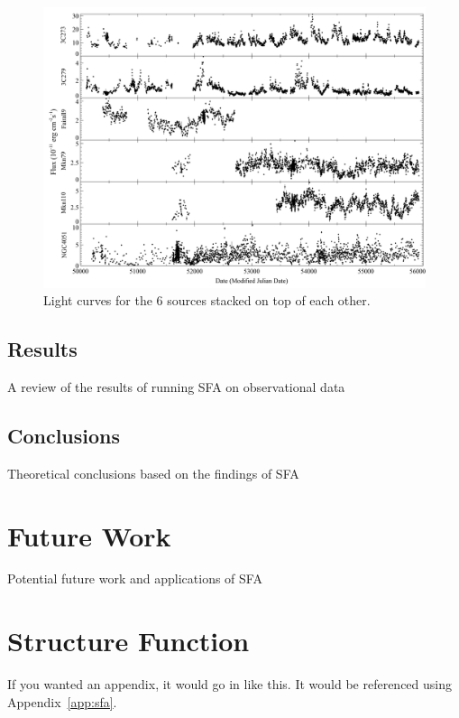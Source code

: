 \documentclass[12pt, oneside]{smuthesis}
\begin{document}
\begin{figure}
	\centering
	\includegraphics[width=\linewidth]{combinedlightcurves}
	\caption{Light curves for the 6 sources stacked on top of each other.}
	\label{fig:combinedlc}
\end{figure}

\section{\sc Results} \label{results}

A review of the results of running SFA on observational data

\section{\sc Conclusions} \label{conclusions}

Theoretical conclusions based on the findings of SFA

\chapter{\sc Future Work} \label{futureWork}

Potential future work and applications of SFA


\appendix

\chapter{Structure Function} \label{appendixSFA}
\label{app:sfa}
If you wanted an appendix, it would go in like this.  It would be 
referenced using Appendix~\ref{app:sfa}.


\begin{singlespace}

\end{singlespace}
\end{document}
